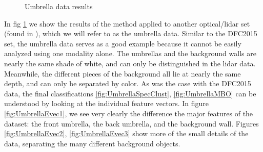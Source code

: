 \documentclass[journal]{IEEEtran}
\begin{document}
\begin{figure}[!t]
{    \label{fig:UmbrellaEvec3}} \hfil {} \hfil {} \hfil {}
  \caption{Umbrella data results}
  \label{fig:Umbrella}
\end{figure}

In fig \ref{fig:Umbrella} we show the results of the method applied to another
optical/lidar set (found in \cite{Scharstein14}), which we will refer to as the
umbrella data. Similar to the DFC2015 set, the umbrella data serves as a good
example because it cannot be easily analyzed using one modality alone. The
umbrellas and the background walls are nearly the same shade of white, and can
only be distinguished in the lidar data. Meanwhile, the different pieces of the
background all lie at nearly the same depth, and can only be separated by
color. As was the case with the DFC2015 data, the final classifications
\ref{fig:UmbrellaSpecClust}, \ref{fig:UmbrellaMBO} can be understood by looking
at the individual feature vectors. In figure \ref{fig:UmbrellaEvec1}, we see
very clearly the difference the major features of the dataset: the front
umbrella, the back umbrella, and the background wall. Figures
\ref{fig:UmbrellaEvec2}, \ref{fig:UmbrellaEvec3} show more of the small details
of the data, separating the many different background objects.
\end{document}
